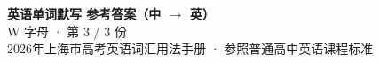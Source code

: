 \documentclass[10pt,a4paper]{article}
\begin{document}
\pagestyle{plain}

\begin{center}
{\LARGE\bfseries 英语单词默写 \quad 参考答案（中 $\to$ 英）}\\[0.22em]
{\large W 字母 · 第 3 / 3 份}\\[0.18em]
{\small 2026年上海市高考英语词汇用法手册 · 参照普通高中英语课程标准}
\end{center}

\vspace{0.2em}
\noindent{\color{rulegray}\rule{\textwidth}{0.8pt}}

\vspace{0.35em}

\vspace{0.25em}
\renewcommand{\arraystretch}{1.32}
\end{document}
